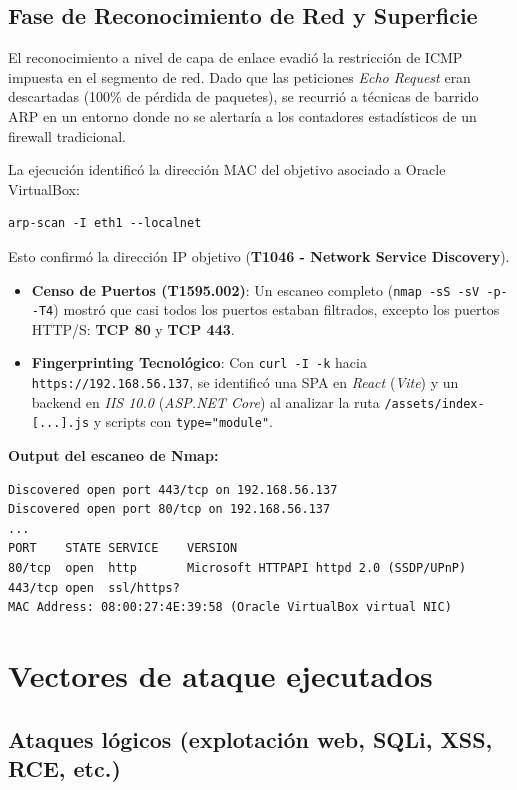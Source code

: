 \subsection{Fase de Reconocimiento de Red y Superficie}
El reconocimiento a nivel de capa de enlace evadió la restricción de ICMP impuesta en el segmento de red. Dado que las peticiones \textit{Echo Request} eran descartadas (100\% de pérdida de paquetes), se recurrió a técnicas de barrido ARP en un entorno donde no se alertaría a los contadores estadísticos de un firewall tradicional. 

La ejecución identificó la dirección MAC del objetivo asociado a Oracle VirtualBox:
\begin{lstlisting}
arp-scan -I eth1 --localnet
\end{lstlisting}
Esto confirmó la dirección IP objetivo (\textbf{T1046 - Network Service Discovery}).

\begin{itemize}
    \item \textbf{Censo de Puertos (T1595.002)}: Un escaneo completo (\texttt{nmap -sS -sV -p- -T4}) mostró que casi todos los puertos estaban filtrados, excepto los puertos HTTP/S: \textbf{TCP 80} y \textbf{TCP 443}.
    \item \textbf{Fingerprinting Tecnológico}: Con \texttt{curl -I -k} hacia \newline\texttt{https://192.168.56.137}, se identificó una SPA en \textit{React} (\textit{Vite}) y un backend en \textit{IIS 10.0} (\textit{ASP.NET Core}) al analizar la ruta \newline\texttt{/assets/index-[...].js} y scripts con \texttt{type="module"}.
\end{itemize}

\textbf{Output del escaneo de Nmap:}
\begin{lstlisting}
Discovered open port 443/tcp on 192.168.56.137
Discovered open port 80/tcp on 192.168.56.137
...
PORT    STATE SERVICE    VERSION
80/tcp  open  http       Microsoft HTTPAPI httpd 2.0 (SSDP/UPnP)
443/tcp open  ssl/https?
MAC Address: 08:00:27:4E:39:58 (Oracle VirtualBox virtual NIC)
\end{lstlisting}

\section[Vectores de Ataque Ejecutados]{Vectores de ataque ejecutados}
\label{sec:vectores_ataque}

\subsection[Ataques Lógicos (Web, SQLi, JWT)]{Ataques lógicos (explotación web, SQLi, XSS, RCE, etc.)}
\label{subsec:ataques_logicos}

